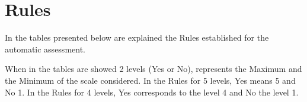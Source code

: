 \chapter{Rules} \label{ap1:loren}

In the tables presented below are explained the Rules established for the automatic assessment.

When in the tables are showed 2 levels (Yes or No), represents the Maximum and the Minimum of the scale considered. In the Rules for 5 levels, Yes means 5 and No 1. In the Rules for 4 levels, Yes corresponds to the level 4 and No the level 1.

%

